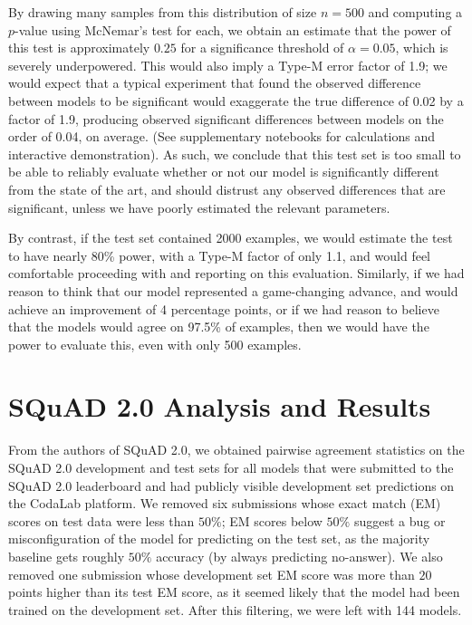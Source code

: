 \documentclass[11pt,a4paper]{article}
\begin{document}
By drawing many samples from this distribution of size $n=500$ and computing a $p$-value using McNemar's test for each, we obtain an estimate that the power of this test is approximately $0.25$ for a significance threshold of $\alpha=0.05$, which is severely underpowered. This would also imply a Type-M error factor of 1.9; we would expect that a typical experiment that found the observed difference between models to be significant would exaggerate the true difference of 0.02 by a factor of 1.9, producing observed significant differences between models on the order of 0.04, on average. (See supplementary notebooks for calculations and  interactive demonstration). As such, we conclude that this test set is too small to be able to  reliably evaluate whether or not our model is significantly different from the state of the art, and should distrust any observed differences that are significant, unless we have poorly estimated the relevant parameters.

By contrast, if the test set contained 2000 examples, we would estimate the test to have nearly 80\% power, with a Type-M factor of only 1.1, and would feel comfortable proceeding with and reporting on this evaluation. Similarly, if we had reason to think that our model represented a game-changing advance, and would achieve an improvement of 4 percentage points, or if we had reason to believe that the models would agree on 97.5\% of examples, then we would have the power to evaluate this, even with only 500 examples. 


\section{SQuAD 2.0 Analysis and Results}
\label{app:squad}

From the authors of SQuAD 2.0, we obtained pairwise agreement statistics on the SQuAD 2.0 development and test sets for all models that were submitted to the SQuAD 2.0 leaderboard 
and had publicly visible development set predictions on the CodaLab platform. 
We removed six submissions whose exact match (EM) scores on test data were less than $50\%$; 
EM scores below $50\%$ suggest a bug or misconfiguration of the model for predicting on the test set, 
as the majority baseline gets roughly $50\%$ accuracy (by always predicting no-answer).
We also removed one submission whose development set EM score was more than $20$ points higher than its test EM score, as it seemed likely that the model had been trained on the development set.
After this filtering, we were left with 144 models.
\end{document}
